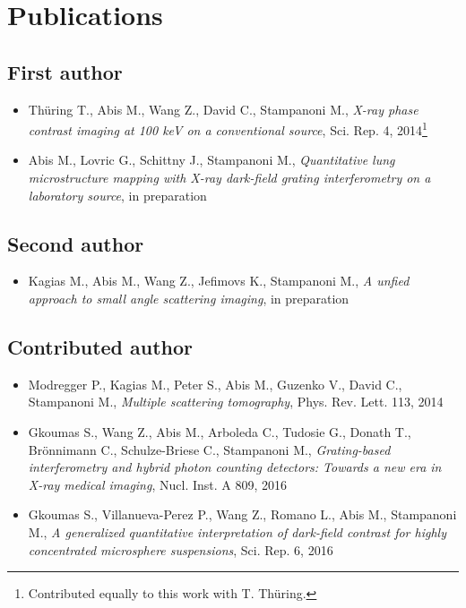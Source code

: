 \chapter*{Publications}
\section*{First author}
\begin{itemize}
    \item Th\"uring T., Abis M., Wang Z., David C., Stampanoni M.,
        \emph{X-ray phase contrast imaging at 100 keV on a conventional
        source}, Sci. Rep. 4, 2014\footnote{Contributed equally to this work
        with T. Th\"uring.}
    \item Abis M., Lovric G., Schittny J., Stampanoni
    M., \emph{Quantitative lung microstructure mapping with X-ray dark-field
    grating interferometry on a laboratory source}, in preparation
\end{itemize}
\section*{Second author}
\begin{itemize}
    \item Kagias M., Abis M., Wang Z., Jefimovs K., Stampanoni M.,
        \emph{A unfied approach to small angle scattering imaging}, in
        preparation
\end{itemize}
\section*{Contributed author}
\begin{itemize}
    \item Modregger P., Kagias M., Peter S., Abis M., Guzenko V., David C.,
        Stampanoni M., \emph{Multiple scattering tomography}, Phys. Rev.
        Lett. 113, 2014
    \item Gkoumas S., Wang Z., Abis M., Arboleda C., Tudosie G., Donath T.,
        Br\"onnimann C., Schulze-Briese C., Stampanoni M.,
        \emph{Grating-based interferometry and hybrid photon counting
        detectors: Towards a new era in X-ray medical imaging}, Nucl. Inst.
        A 809, 2016
    \item Gkoumas S., Villanueva-Perez P., Wang Z., Romano L., Abis M.,
        Stampanoni M., \emph{A generalized quantitative interpretation of
        dark-field contrast for highly concentrated microsphere
    suspensions}, Sci. Rep. 6, 2016
\end{itemize}
